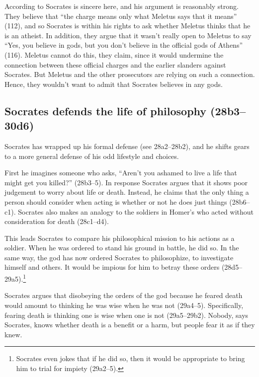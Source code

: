 \documentclass[11pt]{article}
\begin{document}
According to \citeauthor{brickhousesmith2004} Socrates is sincere here, and his argument is reasonably strong.  They believe that ``the charge means only what Meletus says that it means'' (112), and so Socrates is within his rights to ask whether Meletus thinks that he is an atheist.  In addition, they argue that it wasn't really open to Meletus to say ``Yes, you believe in gods, but you don't believe in the official gods of Athens'' (116).  Meletus cannot do this, they claim, since it would undermine the connection between these official charges and the earlier slanders against Socrates.  But Meletus and the other prosecutors are relying on such a connection.  Hence, they wouldn't want to admit that Socrates believes in any gods.



\subsection{Socrates defends the life of philosophy (28b3--30d6)}

Socrates has wrapped up his formal defense (see 28a2--28b2), and he shifts gears to a more general defense of his odd lifestyle and choices.

First he imagines someone who asks, ``Aren't you ashamed to live a life that might get you killed?'' (28b3--5).  In response Socrates argues that it shows poor judgement to worry about life or death. Instead, he claims that the only thing a person should consider when acting is whether or not he does just things (28b6--c1).  Socrates also makes an analogy to the soldiers in Homer's  who acted without consideration for death (28c1--d4).

This leads Socrates to compare his philosophical mission to his actions as a soldier.  When he was ordered to stand his ground in battle, he did so.  In the same way, the god has now ordered Socrates to philosophize, to investigate himself and others.  It would be impious for him to betray these orders (28d5--29a5).\footnote{Socrates even jokes that if he did so, then it would be appropriate to bring him to trial for impiety (29a2--5).}

Socrates argues that disobeying the orders of the god because he feared death would amount to thinking he was wise when he was not (29a4--5).  Specifically, fearing death is thinking one is wise when one is not (29a5--29b2).  Nobody, says Socrates, knows whether death is a benefit or a harm, but people fear it as if they knew.
\end{document}
